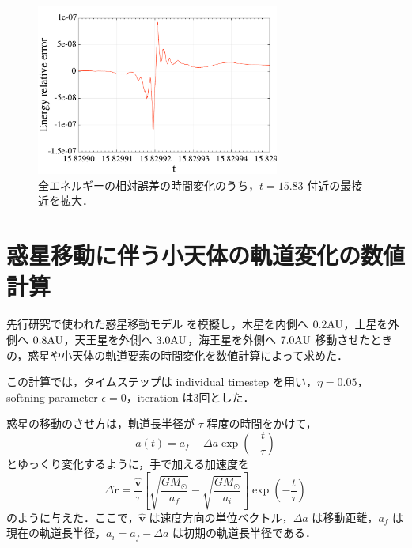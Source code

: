\documentclass[11pt,a4paper,oneside,onecolumn]{jreport}
\begin{document}
\begin{figure}[H]
\centering
\includegraphics[width=8cm]{./image/pythagoras_E_error_detail.pdf}
\caption{全エネルギーの相対誤差の時間変化のうち，$t = 15.83$ 付近の最接近を拡大．\label{fig:pythagoras_E_error_detail}}
\end{figure}

\section{惑星移動に伴う小天体の軌道変化の数値計算}
先行研究で使われた惑星移動モデル\cite{Minton}\cite{Malhotra} を模擬し，木星を内側へ $0.2 {\rm AU}$，土星を外側へ $0.8 {\rm AU}$，天王星を外側へ $3.0 {\rm AU}$，海王星を外側へ $7.0 {\rm AU}$ 移動させたときの，惑星や小天体の軌道要素の時間変化を数値計算によって求めた．

この計算では，タイムステップは individual timestep を用い，$\eta = 0.05$，softning parameter $\epsilon = 0$，iteration は3回とした．

惑星の移動のさせ方は，軌道長半径が $\tau$ 程度の時間をかけて，
\begin{equation}
a (t) = a_f - \Delta a \exp \left( - \frac{t}{\tau} \right) \label{eq:a(t)}
\end{equation}
とゆっくり変化するように，手で加える加速度を
\begin{equation}
\Delta \ddot{\bm r} = \frac{\hat{{\bm v}}}{\tau} \left[ \sqrt{\frac{G M_{\odot}}{a_f}} - \sqrt{\frac{G M_{\odot}}{a_i}} \right] \exp \left(- \frac{t}{\tau} \right) \label{eq:delta_rddot}
\end{equation}
のように与えた\cite{Malhotra}．ここで，$\hat{{\bm v}}$ は速度方向の単位ベクトル，$\Delta a$ は移動距離，$a_f$ は現在の軌道長半径，$a_i = a_f - \Delta a$ は初期の軌道長半径である．
\end{document}
